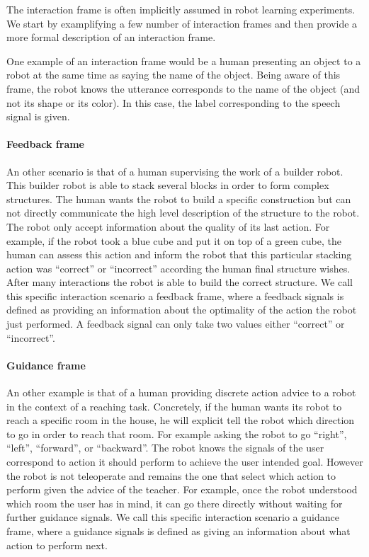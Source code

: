 The interaction frame is often implicitly assumed in robot learning experiments. We start by examplifying a few number of interaction frames and then provide a more formal description of an interaction frame.


One example of an interaction frame would be a human presenting an object to a robot at the same time as saying the name of the object. Being aware of this frame, the robot knows the utterance corresponds to the name of the object (and not its shape or its color). In this case, the label corresponding to the speech signal is given.

\paragraph{Feedback frame}
An other scenario is that of a human supervising the work of a builder robot. This builder robot is able to stack several blocks in order to form complex structures. The human wants the robot to build a specific construction but can not directly communicate the high level description of the structure to the robot. The robot only accept information about the quality of its last action. For example, if the robot took a blue cube and put it on top of a green cube, the human can assess this action and inform the robot that this particular stacking action was ``correct'' or ``incorrect'' according the human final structure wishes. After many interactions the robot is able to build the correct structure. We call this specific interaction scenario a feedback frame, where a feedback signals is defined as providing an information about the optimality of the action the robot just performed. A feedback signal can only take two values either ``correct'' or ``incorrect''.

\paragraph{Guidance frame} An other example is that of a human providing discrete action advice to a robot in the context of a reaching task. Concretely, if the human wants its robot to reach a specific room in the house, he will explicit tell the robot which direction to go in order to reach that room. For example asking the robot to go ``right'', ``left'', ``forward'', or ``backward''. The robot knows the signals of the user correspond to action it should perform to achieve the user intended goal. However the robot is not teleoperate and remains the one that select which action to perform given the advice of the teacher. For example, once the robot understood which room the user has in mind, it can go there directly without waiting for further guidance signals. We call this specific interaction scenario a guidance frame, where a guidance signals is defined as giving an information about what action to perform next.


